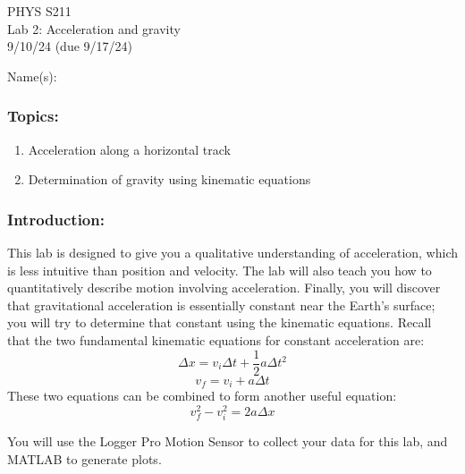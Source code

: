 \documentclass[11pt,letterpaper]{article}
\begin{document}
\setlength{\parindent}{0in}

\begin{flushright}
PHYS S211\\
Lab 2: Acceleration and gravity\\
9/10/24 (due 9/17/24)
\end{flushright}

Name(s):\\

\subsubsection*{Topics:}
\begin{enumerate}
\setlength{\parskip}{3pt}
\item Acceleration along a horizontal track
\item Determination of gravity using kinematic equations
\end{enumerate}

\subsubsection*{Introduction:}
This lab is designed to give you a qualitative understanding of acceleration, which is less intuitive than position and velocity. The lab will also teach you how to quantitatively describe motion involving acceleration. Finally, you will discover that gravitational acceleration is essentially constant near the Earth's surface; you will try to determine that constant using the kinematic equations. Recall that the two fundamental kinematic equations for constant acceleration are:
$$\Delta{x}=v_i\Delta{t}+\frac{1}{2}a\Delta{t}^2$$
$$v_f=v_i+a\Delta{t}$$
These two equations can be combined to form another useful equation:
$$v_f^2-v_i^2=2a\Delta{x}$$

You will use the Logger Pro Motion Sensor to collect your data for this lab, and MATLAB to generate plots.
\end{document}
